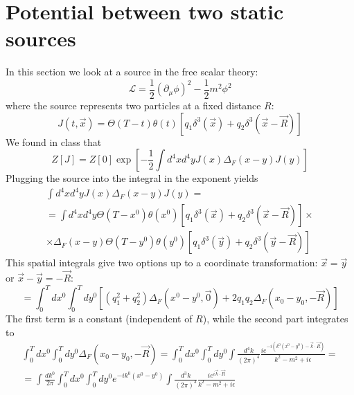 \documentclass{article}
\begin{document}
\section{Potential between two static sources}
In this section we look at a source in the free scalar theory:
\begin{equation}
    \mathcal{L} = \frac{1}{2}\left(\partial_\mu \phi\right)^2 - \frac{1}{2}m^2\phi^2
\end{equation}
where the source represents two particles at a fixed distance $R$:
\begin{equation}
    J(t, \vec{x}) = \Theta(T - t)\theta(t)\left[
        q_1\delta^3(\vec{x}) + q_2\delta^3(\vec{x} - \vec{R})
    \right]
\end{equation}
We found in class that
\begin{equation}
    Z[J] = Z[0]\exp[-\frac{1}{2}\int d^4x d^4y J(x)\Delta_F(x - y)J(y)]
\end{equation}
Plugging the source into the integral in the exponent yields
\begin{equation}
\begin{gathered}
    \int d^4x d^4y J(x)\Delta_F(x - y)J(y) = \\ =
    \int d^4x d^4y \Theta(T - x^0)\theta(x^0)\left[
        q_1\delta^3(\vec{x}) + q_2\delta^3(\vec{x} - \vec{R})
    \right] \times \\ \times
    \Delta_F(x - y)
    \Theta(T - y^0)\theta( y^0)\left[
        q_1\delta^3(\vec{y}) + q_2\delta^3(\vec{y} - \vec{R})
    \right]
\end{gathered}
\end{equation}
This spatial integrals give two options up to a coordinate transformation: $\vec{x} = \vec{y}$ or $\vec{x} - \vec{y} = -\vec{R}$:
\begin{equation}
    = \int_0^T dx^0 \int_0^T dy^0 \left[
        \left(q_1^2 + q_2^2\right)\Delta_F(x^0 - y^0, \vec{0}) +
        2q_1q_2\Delta_F(x_0 - y_0, -\vec{R})
    \right]
\end{equation}
The first term is a constant (independent of $R$), while the second part integrates to
\begin{equation}
\begin{gathered}
    \int_0^T dx^0 \int_0^T dy^0 \Delta_F(x_0 - y_0, -\vec{R}) = \int_0^T dx^0 \int_0^T dy^0 \int \frac{d^4k}{(2\pi)^4} \frac{ie^{-i(k^0(x^0 - y^0) - \vec{k}\cdot\vec{R})}}{k^2 - m^2 + i\epsilon} = \\ =
    \int \frac{dk^0}{2\pi} \int_0^T dx^0 \int_0^T dy^0 e^{-ik^0(x^0 - y^0)} \int \frac{d^3k}{(2\pi)^3} \frac{ie^{i\vec{k}\cdot\vec{R}}}{k^2 - m^2 + i\epsilon}
\end{gathered}
\end{equation}
\end{document}
